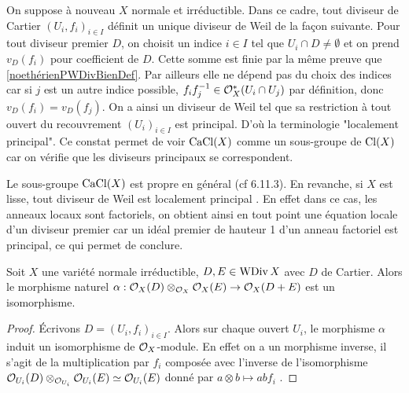 On suppose à nouveau $X$ normale et irréductible. Dans ce cadre, tout diviseur de Cartier $(U_i, f_i)_{i\in I}$ définit un unique diviseur de Weil de la façon suivante. Pour tout diviseur premier $D$, on choisit un indice $i\in I$ tel que $U_i\cap D\neq \emptyset$ et on prend $v_D(f_i)$ pour coefficient de $D$. Cette somme est finie par la même preuve que \ref{noethérienPWDivBienDef}. Par ailleurs elle ne dépend pas du choix des indices car si $j$ est un autre indice possible, $f_if_j^{-1}\in \mathcal{O}_X^*(U_i\cap U_j)$ par définition, donc $v_D(f_i)=v_D(f_j)$. On a ainsi un diviseur de Weil tel que sa restriction à tout ouvert du recouvrement $(U_i)_{i\in I}$ est principal. D'où la terminologie "localement principal". Ce constat permet de voir $\operatorname{CaCl}(X)$ comme un sous-groupe de $\operatorname{Cl}(X)$ car on vérifie que les diviseurs principaux se correspondent.

Le sous-groupe $\operatorname{CaCl}(X)$ est propre en général (cf \cite{Hartshorne} 6.11.3). En revanche, si $X$ est lisse, tout diviseur de Weil est localement principal . En effet dans ce cas, les anneaux locaux sont factoriels, on obtient ainsi en tout point une équation locale d'un diviseur premier car un idéal premier de hauteur 1 d'un anneau factoriel est principal, ce qui permet de conclure.

\begin{prop}\label{isomophismeOTimes}
Soit $X$ une variété normale irréductible, $D,E\in\operatorname{WDiv} X$ avec $D$ de Cartier. Alors le morphisme naturel $\alpha:\mathcal{O}_X(D)\otimes_{\mathcal{O}_X}\mathcal{O}_X(E)\rightarrow \mathcal{O}_X(D+E)$ est un isomorphisme.
\end{prop}
\begin{proof}
Écrivons $D=(U_i,f_i)_{i\in I}$. Alors sur chaque ouvert $U_i$, le morphisme $\alpha$ induit un isomorphisme de $\mathcal{O}_X$-module. En effet on a un morphisme inverse, il s'agit de la multiplication par $f_i$ composée avec l'inverse de l'isomorphisme $\mathcal{O}_{U_i}(D)\otimes_{\mathcal{O}_{U_i}}\mathcal{O}_{U_i}(E) \simeq \mathcal{O}_{U_i}(E)$ donné par $a\otimes b\mapsto abf_i$ .
\end{proof}

